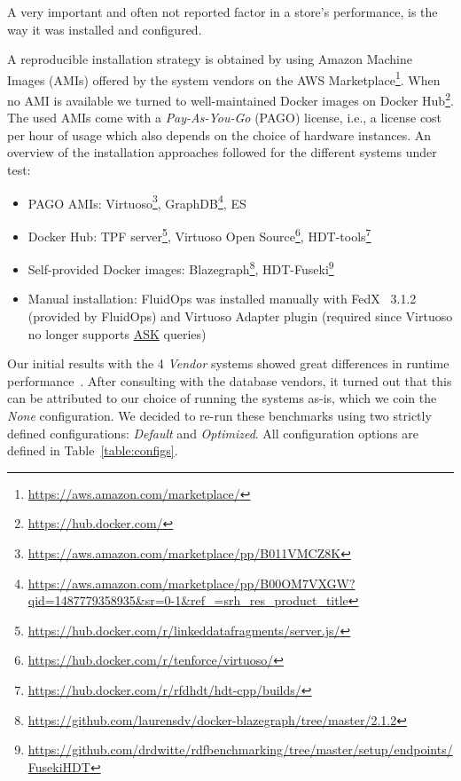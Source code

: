 A very important and often not reported factor in a store's performance, is the way it was installed and configured. 

A reproducible installation strategy is obtained by using Amazon Machine Images (AMIs) offered by the system vendors on the AWS Marketplace\footnote{\scriptsize \url{https://aws.amazon.com/marketplace/}}. When no AMI is available we turned to well-maintained Docker images on Docker Hub\footnote{\scriptsize \url{https://hub.docker.com/}}.
The used AMIs come with a \emph{Pay-As-You-Go} (PAGO) license, i.e., a license cost per hour of usage which also depends on the choice of hardware instances.
An overview of the installation approaches followed for the different systems under test:
\begin{itemize}
	\item PAGO AMIs: Virtuoso\footnote{\scriptsize \url{https://aws.amazon.com/marketplace/pp/B011VMCZ8K}}, GraphDB\footnote{\scriptsize \url{https://aws.amazon.com/marketplace/pp/B00OM7VXGW?qid=1487779358935&sr=0-1&ref_=srh_res_product_title}}, ES
	\item Docker Hub: TPF server\footnote{\scriptsize \url{https://hub.docker.com/r/linkeddatafragments/server.js/}}, Virtuoso Open Source\footnote{\scriptsize \url{https://hub.docker.com/r/tenforce/virtuoso/}}, HDT-tools\footnote{\scriptsize \url{https://hub.docker.com/r/rfdhdt/hdt-cpp/builds/}}
	\item Self-provided Docker images: Blazegraph\footnote{\scriptsize \url{https://github.com/laurensdv/docker-blazegraph/tree/master/2.1.2}}, HDT-Fuseki\footnote{\scriptsize \url{https://github.com/drdwitte/rdfbenchmarking/tree/master/setup/endpoints/FusekiHDT}}
	\item Manual installation: FluidOps was installed manually with FedX~\cite{saleem2016fine} 3.1.2 (provided by \mbox{FluidOps}) and Virtuoso Adapter plugin (required since \mbox{Virtuoso} no longer supports \url{ASK} queries)
\end{itemize}

Our initial results with the 4 \emph{Vendor} systems showed great differences in runtime performance~\cite{de2016big}. After consulting with the database vendors, it turned out that this can be attributed to our choice of running the systems as-is, which we coin the \emph{None} configuration. We decided to re-run these benchmarks using two strictly defined configurations: \emph{Default} and \emph{Optimized}. All configuration options are defined in Table~\ref{table:configs}. 

